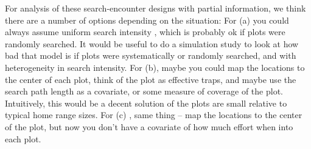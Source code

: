 For analysis of these search-encounter designs with partial information,
we think there are a number of options depending on the situation:
For (a) you could always assume uniform search intensity ,
which is probably ok if plots were randomly searched.
It would be useful to do a simulation study to look at how bad that
model is if plots were systematically or randomly searched, and with
heterogeneity in search intensity.
For (b), maybe you could map the locations to the center of each plot,
think of the plot as effective traps, and maybe use the search path
length as a covariate, or some measure of coverage of the
plot. Intuitively, this would be a decent solution of the plots are
small relative to typical home range sizes.
For (c) , same thing -- map the locations to the center of the plot,
but now you don't have a covariate of how much effort when into each
plot.

